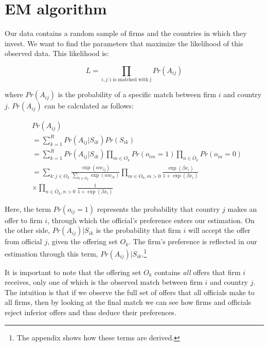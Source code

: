 \section{EM algorithm}

Our data contains a random sample of firms and the countries in which they invest. We want to find the parameters that maximize the likelihood of this observed data. This likelihood is:

\[
L = \prod_{i,j: \text{i is matched with j}} Pr(A_{ij})
\]

where $Pr(A_{ij})$ is the probability of a specific match between firm $i$ and country $j$. $Pr(A_{ij})$ can be calculated as follows:

\begin{align}
&Pr(A_{ij}) \\
&= \sum_{k=1}^R Pr(A_{ij}|S_{ik}) Pr(S_{ik}) \\
&= \sum_{k=1}^R Pr(A_{ij} | S_{ik}) \prod_{m \in O_k} Pr(o_{im} = 1) \prod_{n \in \bar O_k} Pr(o_{in} = 0) \\
&= \sum_{k:j \in O_k} \frac{\exp(\alpha w_{ij})}{\displaystyle\sum_{h \in O_k} \exp(\alpha w_{ih})} \prod_{m \in O_k, m > 0} \frac{\exp(\beta x_{i})}{1 + \exp(\beta x_i)} \\
&\times \prod_{n \in \bar O_k, n > 0} \frac{1}{1 + \exp(\beta x_i)}
\end{align}

Here, the term $Pr(o_{ij} = 1)$ represents the probability that country $j$ makes an offer to firm $i$, through which the official's preference enters our estimation. On the other side, $Pr(A_{ij}) | S_{ik}$ is the probability that firm $i$ will accept the offer from official $j$, given the offering set $O_k$. The firm's preference is reflected in our estimation through this term, $Pr(A_{ij})|S_{ik}$.\footnote{The appendix shows how these terms are derived.}

It is important to note that the offering set $O_k$ contains \textit{all} offers that firm $i$ receives, only one of which is the observed match between firm $i$ and country $j$. The intuition is that if we observe the full set of offers that all officials make to all firms, then by looking at the final match we can see how firms and officials reject inferior offers and thus deduce their preferences.
